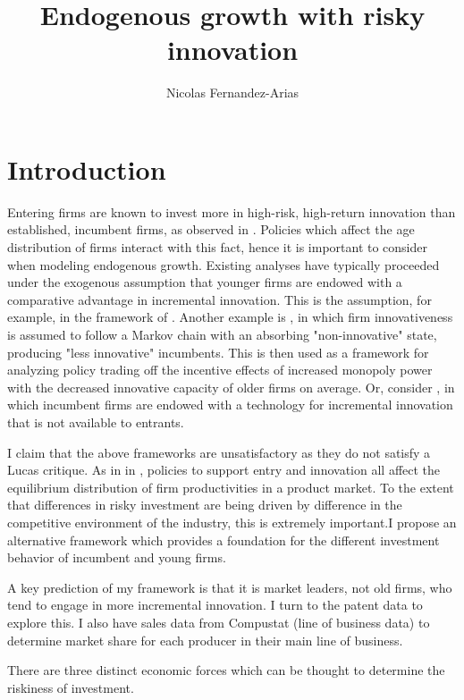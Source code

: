 \documentclass[12pt,english]{article}
\theoremstyle{remark}
\begin{document}
	
\title{Endogenous growth with risky innovation}
\author{Nicolas Fernandez-Arias}
\maketitle

\section{Introduction}

Entering firms are known to invest more in high-risk, high-return innovation than established, incumbent firms, as observed in \cite{akcigit_growth_2018}. Policies which affect the age distribution of firms interact with this fact, hence it is important to consider when modeling endogenous growth. Existing analyses have typically proceeded under the exogenous assumption that younger firms are endowed with a comparative advantage in incremental innovation. This is the assumption, for example, in the framework of \cite{akcigit_growth_2018}. Another example is \cite{acemoglu_innovation_2013}, in which firm innovativeness is assumed to follow a Markov chain with an absorbing "non-innovative" state, producing "less innovative" incumbents. This is then used as a framework for analyzing policy trading off the incentive effects of increased monopoly power with the decreased innovative capacity of older firms on average. Or, consider \cite{acemoglu_innovation_2015}, in which incumbent firms are endowed with a technology for incremental innovation that is not available to entrants. 

I claim that the above frameworks are unsatisfactory as they do not satisfy a Lucas critique. As in in \cite{aghion_competition_2005}, policies to support entry and innovation all affect the equilibrium distribution of firm productivities in a product market. To the extent that differences in risky investment are being driven by difference in the competitive environment of the industry, this is extremely important.I propose an alternative framework which provides a foundation for the different investment behavior of incumbent and young firms. 

A key prediction of my framework is that it is market leaders, not old firms, who tend to engage in more incremental innovation. I turn to the patent data to explore this. I also have sales data from Compustat (line of business data) to determine market share for each producer in their main line of business. 

There are three distinct economic forces which can be thought to determine the riskiness of investment. 
\end{document}
